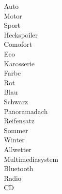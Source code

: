 \noindent
\unfold\blank\myPlus Auto\\
\tab\unfold\mandatory\myPlus Motor\\
\tab\tab\unfold\Alternative\myPlusblank Sport\\
\tab\tab\tab\nofold\optional\myBox Heckspoiler\\
\tab\tab\nofold\Alternative\myMinus Comofort\\
\tab\tab\nofold\Alternative\myMinus Eco\\
\tab\unfold\mandatory\myPlus Karosserie\\
\tab\tab\unfold\mandatory\myPlus Farbe\\
\tab\tab\tab\nofold\Alternative\myMinus Rot\\
\tab\tab\tab\nofold\Alternative\myPlusblank Blau\\
\tab\tab\tab\nofold\Alternative\myMinus Schwarz\\
\tab\tab\nofold\optional\myBox Panoramadach\\
\tab\unfold\mandatory\myPlus Reifensatz\\
\tab\tab\nofold\myOr\myPlusblank Sommer\\
\tab\tab\nofold\myOr\myPlusblank Winter\\
\tab\tab\nofold\myOr\myBox Allwetter\\
\tab\unfold\mandatory\myPlus Multimediasystem\\
\tab\tab\nofold\optional\myBox Bluetooth\\
\tab\tab\nofold\optional\myPlusblank Radio\\
\tab\tab\nofold\optional\myBox CD\\
